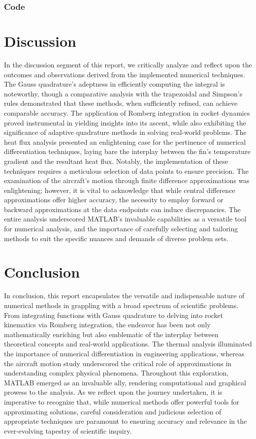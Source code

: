 \documentclass[12pt, a4paper]{article}
\numberwithin{equation}{section}
\begin{document}
\newpage
\subsubsection{Code}

\newpage
\section{Discussion}
In the discussion segment of this report, we critically analyze and reflect upon the outcomes and observations derived from the implemented numerical techniques. The Gauss quadrature’s adeptness in efficiently computing the integral is noteworthy, though a comparative analysis with the trapezoidal and Simpson's rules demonstrated that these methods, when sufficiently refined, can achieve comparable accuracy. The application of Romberg integration in rocket dynamics proved instrumental in yielding insights into its ascent, while also exhibiting the significance of adaptive quadrature methods in solving real-world problems. The heat flux analysis presented an enlightening case for the pertinence of numerical differentiation techniques, laying bare the interplay between the fin’s temperature gradient and the resultant heat flux. Notably, the implementation of these techniques requires a meticulous selection of data points to ensure precision. The examination of the aircraft's motion through finite difference approximations was enlightening; however, it is vital to acknowledge that while central difference approximations offer higher accuracy, the necessity to employ forward or backward approximations at the data endpoints can induce discrepancies. The entire analysis underscored MATLAB’s invaluable capabilities as a versatile tool for numerical analysis, and the importance of carefully selecting and tailoring methods to suit the specific nuances and demands of diverse problem sets.

\section{Conclusion}
In conclusion, this report encapsulates the versatile and indispensable nature of numerical methods in grappling with a broad spectrum of scientific problems. From integrating functions with Gauss quadrature to delving into rocket kinematics via Romberg integration, the endeavor has been not only mathematically enriching but also emblematic of the interplay between theoretical concepts and real-world applications. The thermal analysis illuminated the importance of numerical differentiation in engineering applications, whereas the aircraft motion study underscored the critical role of approximations in understanding complex physical phenomena. Throughout this exploration, MATLAB emerged as an invaluable ally, rendering computational and graphical prowess to the analysis. As we reflect upon the journey undertaken, it is imperative to recognize that, while numerical methods offer powerful tools for approximating solutions, careful consideration and judicious selection of appropriate techniques are paramount to ensuring accuracy and relevance in the ever-evolving tapestry of scientific inquiry.
\end{document}
